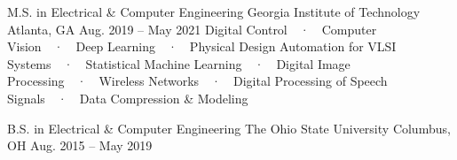 

\begin{cventries}

  \cventry
    {M.S. in Electrical \& Computer Engineering} %
    {Georgia Institute of Technology} %
    {Atlanta, GA} %
    {Aug. 2019 – May 2021} %
    {
      Digital Control~~·~~Computer Vision~~·~~Deep Learning~~·~~Physical Design Automation for VLSI Systems~~·~~Statistical Machine Learning~~·~~Digital Image Processing~~·~~Wireless Networks~~·~~Digital Processing of Speech Signals~~·~~Data Compression \& Modeling
    }

  \cventry
    {B.S. in Electrical \& Computer Engineering} %
    {The Ohio State University} %
    {Columbus, OH} %
    {Aug. 2015 – May 2019} %
    {}

\end{cventries}
